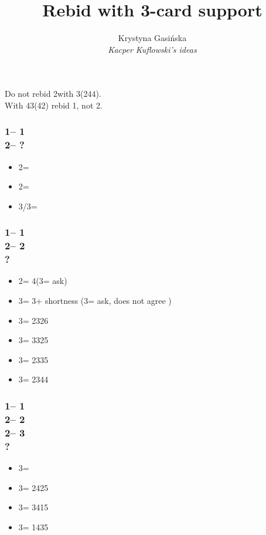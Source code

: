\documentclass[12pt, a4paper]{article}
\title{Rebid with 3-card support}
\author{Krystyna Gasińska\\\textit{Kacper Kuflowski's ideas}}
\begin{document}
\maketitle


Do not rebid 2\spades with 3(244).\\
With 43(42) rebid 1\spades, not 2\hearts.

\subsubsection*{1\clubs -- 1\hearts\\
                2\hearts -- ?}
\begin{itemize}
    \item 2\spades = \gf
    \item 2\nt = \inv \spades
    \item 3\minor/3\hearts = \inv
\end{itemize}

\subsubsection*{1\clubs -- 1\hearts\\
                2\hearts -- 2\spades\\
                ?}
\begin{itemize}
    \item 2\nt = 4\hearts (3\clubs = ask)
    \item 3\clubs = 3\hearts + shortness (3\diams = ask, does not agree \hearts)
    \item 3\diams = 2326
    \item 3\hearts = 3325
    \item 3\spades = 2335
    \item 3\nt = 2344
\end{itemize}

\subsubsection*{1\clubs -- 1\hearts\\
                2\hearts -- 2\spades\\
                2\nt -- 3\clubs\\
                ?}
\begin{itemize}
    \item 3\diams = \bal
    \item 3\hearts = 2425
    \item 3\spades = 3415
    \item 3\nt = 1435
\end{itemize}
\end{document}
